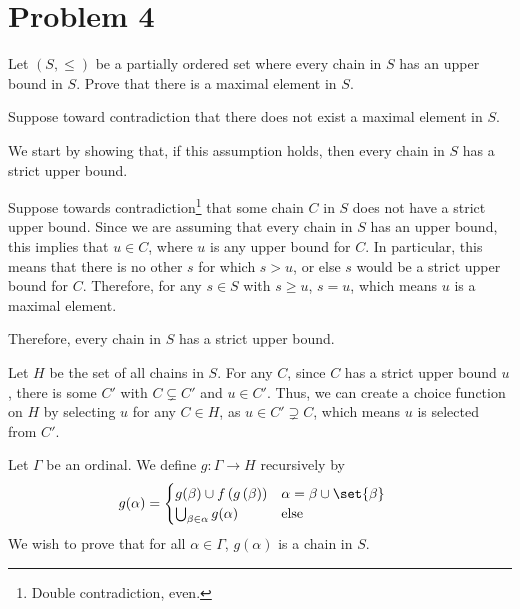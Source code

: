 \documentclass[12pt]{mypackage}
\begin{document}
\section{Problem 4}%
\begin{problem}
  Let $\left(S,\leq\right)$ be a partially ordered set where every chain in $S$ has an upper bound in $S$. Prove that there is a maximal element in $S$.
\end{problem}
\begin{solution}
  Suppose toward contradiction that there does not exist a maximal element in $S$.\newline

  We start by showing that, if this assumption holds, then every chain in $S$ has a strict upper bound.\newline

  Suppose towards contradiction\footnote{Double contradiction, even.} that some chain $C$ in $S$ does not have a strict upper bound. Since we are assuming that every chain in $S$ has an upper bound, this implies that $u\in C$, where $u$ is any upper bound for $C$. In particular, this means that there is no other $s$ for which $s > u$, or else $s$ would be a strict upper bound for $C$. Therefore, for any $s\in S$ with $s\geq u$, $s = u$, which means $u$ is a maximal element.\newline

  Therefore, every chain in $S$ has a strict upper bound.\newline

  Let $H$ be the set of all chains in $S$. For any $C$, since $C$ has a strict upper bound $u$, there is some $C'$ with $C\subsetneq C'$ and $u\in C'$. Thus, we can create a choice function on $H$ by selecting $u$ for any $C\in H$, as $u\in C'\supsetneq C$, which means $u$ is selected from $C'$.\newline

  Let $\Gamma$ be an ordinal. We define $g: \Gamma \rightarrow H$ recursively by
  \begin{align*}
    g(\alpha) &= \begin{cases}
      g(\beta)\cup f\left(g\left(\beta\right)\right) & \alpha = \beta \cup \set{\beta}\\
      \bigcup_{\beta \in \alpha}g(\alpha) & $\text{else}$
    \end{cases}
  \end{align*}
  We wish to prove that for all $\alpha\in \Gamma$, $g\left(\alpha\right)$ is a chain in $S$.\newline


\end{solution}
\end{document}
